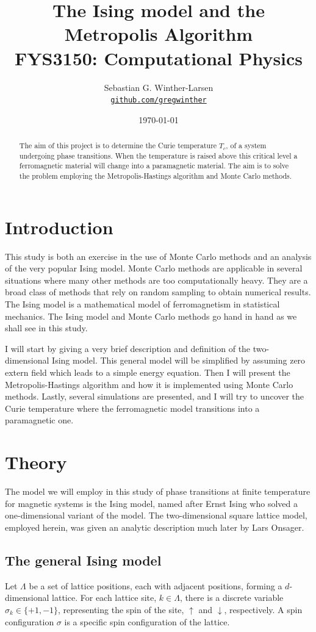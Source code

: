 \documentclass[10pt,a4paper]{amsart}
\title[Ising Model]{The Ising model and the Metropolis Algorithm \\ 
	\hrulefill\small{ FYS3150: Computational Physics }\hrulefill}
\author[Winther-Larsen]{Sebastian G. Winther-Larsen \\
\href{https://github.com/gregwinther/FYS3150/}{\texttt{github.com/gregwinther}}}
\date{\today}
\begin{document}
\begin{titlepage}
\begin{abstract}
The aim of this project is to determine the Curie temperature $T_c$, of a system undergoing phase transitions. When the temperature is raised above this critical level a ferromagnetic material will change into a paramagnetic material. The aim is to solve the problem employing the Metropolis-Hastings algorithm and Monte Carlo methods.
\end{abstract}
\maketitle
\tableofcontents
\end{titlepage}

\section{Introduction}
This study is both an exercise in the use of Monte Carlo methods and an analysis of the very popular Ising model. Monte Carlo methods are applicable in several situations where many other methods are too computationally heavy. They are a broad class of methods that rely on random sampling to obtain numerical results. The Ising model is a mathematical model of ferromagnetism in statistical mechanics. The Ising model and Monte Carlo methods go hand in hand as we shall see in this study.

I will start by giving a very brief description and definition of the two-dimensional Ising model. This general model will be simplified by assuming zero extern field which leads to a simple energy equation. Then I will present the Metropolis-Hastings algorithm and how it is implemented using Monte Carlo methods. Lastly, several simulations are presented, and I will try to uncover the Curie temperature where the ferromagnetic model transitions into a paramagnetic one.

\section{Theory}
The model we will employ in this study of phase transitions at finite temperature for magnetic systems is the Ising model, named after Ernst Ising who solved a one-dimensional variant of the model\cite{Ising}. The two-dimensional square lattice model, employed herein, was given an analytic description much later by Lars Onsager\cite{Onsager}.

\subsection{The general Ising model}
Let $\Lambda$ be a set of lattice positions, each with adjacent positions, forming a $d$-dimensional lattice. For each lattice site, $k \in \Lambda$, there is a discrete variable $\sigma_k \in \{+1,-1\}$, representing the spin of the site, $\uparrow$ and $\downarrow$, respectively. A spin configuration $\sigma$ is a specific spin configuration of the lattice.
\end{document}
